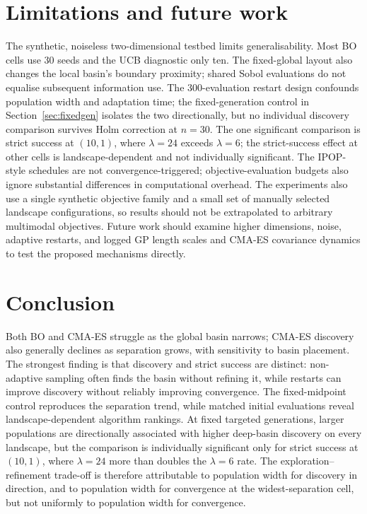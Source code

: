 \documentclass[11pt,a4paper]{article}
\begin{document}
\section{Limitations and future work}\label{sec:limitations}
The synthetic, noiseless two-dimensional testbed limits generalisability. Most BO cells use 30 seeds and the UCB diagnostic only ten. The fixed-global layout also changes the local basin's boundary proximity; shared Sobol evaluations do not equalise subsequent information use. The 300-evaluation restart design confounds population width and adaptation time; the fixed-generation control in Section~\ref{sec:fixedgen} isolates the two directionally, but no individual discovery comparison survives Holm correction at $n=30$. The one significant comparison is strict success at $(10,1)$, where $\lambda=24$ exceeds $\lambda=6$; the strict-success effect at other cells is landscape-dependent and not individually significant. The IPOP-style schedules are not convergence-triggered; objective-evaluation budgets also ignore substantial differences in computational overhead. The experiments also use a single synthetic objective family and a small set of manually selected landscape configurations, so results should not be extrapolated to arbitrary multimodal objectives. Future work should examine higher dimensions, noise, adaptive restarts, and logged GP length scales and CMA-ES covariance dynamics to test the proposed mechanisms directly.

\section{Conclusion}
Both BO and CMA-ES struggle as the global basin narrows; CMA-ES discovery also generally declines as separation grows, with sensitivity to basin placement. The strongest finding is that discovery and strict success are distinct: non-adaptive sampling often finds the basin without refining it, while restarts can improve discovery without reliably improving convergence. The fixed-midpoint control reproduces the separation trend, while matched initial evaluations reveal landscape-dependent algorithm rankings. At fixed targeted generations, larger populations are directionally associated with higher deep-basin discovery on every landscape, but the comparison is individually significant only for strict success at $(10,1)$, where $\lambda=24$ more than doubles the $\lambda=6$ rate. The exploration--refinement trade-off is therefore attributable to population width for discovery in direction, and to population width for convergence at the widest-separation cell, but not uniformly to population width for convergence.
\end{document}
